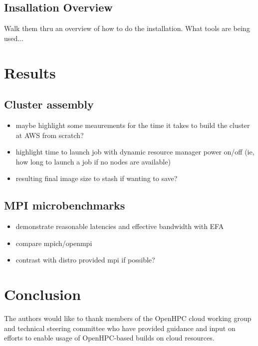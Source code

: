 \documentclass[sigconf,screen]{acmart}
\begin{document}
\subsection{Insallation Overview}
Walk them thru an overview of how to do the installation. What tools are being
used...

\lipsum[4]

\section{Results}
\lipsum[6]
\subsection{Cluster assembly}
\begin{itemize}
\item maybe highlight some meaurements for the time it takes to build the
  cluster at AWS from scratch?
\item highlight time to launch job with dynamic resource manager power on/off
  (ie, how long to launch a job if no nodes are available)
\item resulting final image size to stash if wanting to save?
\end{itemize}

\subsection{MPI microbenchmarks}
\begin {itemize}
\item demonstrate reasonable latencies and effective bandwidth with EFA
\item compare mpich/openmpi
\item contrast with distro provided mpi if possible?
\end{itemize}
\lipsum[7]

\section{Conclusion}
\lipsum[8]

\begin{acks}
The authors would like to thank members of the OpenHPC cloud working group and
technical steering committee who have provided guidance and input on efforts to
enable usage of OpenHPC-based builds on cloud resources.
\end{acks}

\nocite{*}



\end{document}
